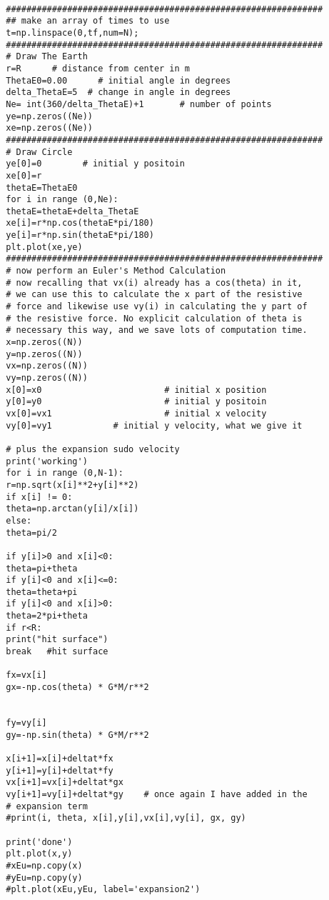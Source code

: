 \begin{small}
\begin{verbatim}
		
		##############################################################
		## make an array of times to use
		t=np.linspace(0,tf,num=N);
		##############################################################
		# Draw The Earth
		r=R      # distance from center in m
		ThetaE0=0.00      # initial angle in degrees
		delta_ThetaE=5  # change in angle in degrees
		Ne= int(360/delta_ThetaE)+1       # number of points
		ye=np.zeros((Ne))
		xe=np.zeros((Ne))
		##############################################################
		# Draw Circle
		ye[0]=0        # initial y positoin
		xe[0]=r
		thetaE=ThetaE0
		for i in range (0,Ne):
		thetaE=thetaE+delta_ThetaE
		xe[i]=r*np.cos(thetaE*pi/180)
		ye[i]=r*np.sin(thetaE*pi/180)
		plt.plot(xe,ye)
		##############################################################
		# now perform an Euler's Method Calculation
		# now recalling that vx(i) already has a cos(theta) in it,
		# we can use this to calculate the x part of the resistive
		# force and likewise use vy(i) in calculating the y part of
		# the resistive force. No explicit calculation of theta is
		# necessary this way, and we save lots of computation time.
		x=np.zeros((N))
		y=np.zeros((N))
		vx=np.zeros((N))
		vy=np.zeros((N))
		x[0]=x0                        # initial x position
		y[0]=y0                        # initial y positoin
		vx[0]=vx1                      # initial x velocity
		vy[0]=vy1            # initial y velocity, what we give it
		
		# plus the expansion sudo velocity
		print('working')
		for i in range (0,N-1):
		r=np.sqrt(x[i]**2+y[i]**2)
		if x[i] != 0:
		theta=np.arctan(y[i]/x[i])
		else:
		theta=pi/2
		
		if y[i]>0 and x[i]<0:
		theta=pi+theta
		if y[i]<0 and x[i]<=0:
		theta=theta+pi
		if y[i]<0 and x[i]>0:
		theta=2*pi+theta
		if r<R:
		print("hit surface")
		break   #hit surface
		
		fx=vx[i]
		gx=-np.cos(theta) * G*M/r**2
		
		
		fy=vy[i]
		gy=-np.sin(theta) * G*M/r**2
		
		x[i+1]=x[i]+deltat*fx
		y[i+1]=y[i]+deltat*fy
		vx[i+1]=vx[i]+deltat*gx
		vy[i+1]=vy[i]+deltat*gy    # once again I have added in the 
		# expansion term
		#print(i, theta, x[i],y[i],vx[i],vy[i], gx, gy)
		
		print('done')
		plt.plot(x,y)
		#xEu=np.copy(x)
		#yEu=np.copy(y)
		#plt.plot(xEu,yEu, label='expansion2')
		

\end{verbatim}
\end{small}
